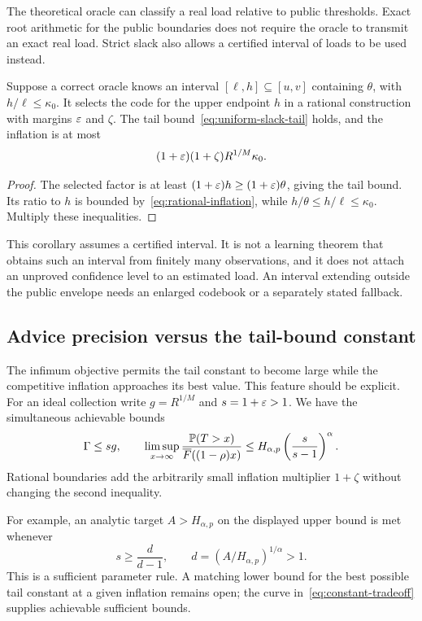 The theoretical oracle can classify a real load relative to public thresholds. Exact root arithmetic for the public boundaries does not require the oracle to transmit an exact real load. Strict slack also allows a certified interval of loads to be used instead.

\begin{corollary}\label{cor:load-interval}
Suppose a correct oracle knows an interval $[\ell,h]\subseteq[u,v]$ containing $\theta$, with $h/\ell\leq\kappa_0$. It selects the code for the upper endpoint $h$ in a rational construction with margins $\varepsilon$ and $\zeta$. The tail bound~\eqref{eq:uniform-slack-tail} holds, and the inflation is at most
\begin{equation}\label{eq:interval-inflation}
 (1+\varepsilon)(1+\zeta)R^{1/M}\kappa_0.
\end{equation}
\end{corollary}
\begin{proof}
The selected factor is at least $(1+\varepsilon)h\geq(1+\varepsilon)\theta$, giving the tail bound. Its ratio to $h$ is bounded by~\eqref{eq:rational-inflation}, while $h/\theta\leq h/\ell\leq\kappa_0$. Multiply these inequalities.
\end{proof}

This corollary assumes a certified interval. It is not a learning theorem that obtains such an interval from finitely many observations, and it does not attach an unproved confidence level to an estimated load. An interval extending outside the public envelope needs an enlarged codebook or a separately stated fallback.

\subsection{Advice precision versus the tail-bound constant}
The infimum objective permits the tail constant to become large while the competitive inflation approaches its best value. This feature should be explicit. For an ideal collection write $g=R^{1/M}$ and $s=1+\varepsilon>1$. We have the simultaneous achievable bounds
\begin{equation}\label{eq:constant-tradeoff}
 \Gamma\leq sg,
 \qquad
 \limsup_{x\to\infty}\frac{\mathbb P(T>x)}{\overline F((1-\rho)x)}
 \leq H_{\alpha,p}\left(\frac{s}{s-1}\right)^\alpha.
\end{equation}
Rational boundaries add the arbitrarily small inflation multiplier $1+\zeta$ without changing the second inequality.

For example, an analytic target $A>H_{\alpha,p}$ on the displayed upper bound is met whenever
\[
 s\geq\frac{d}{d-1},\qquad d=(A/H_{\alpha,p})^{1/\alpha}>1.
\]
This is a sufficient parameter rule. A matching lower bound for the best possible tail constant at a given inflation remains open; the curve in~\eqref{eq:constant-tradeoff} supplies achievable sufficient bounds.

